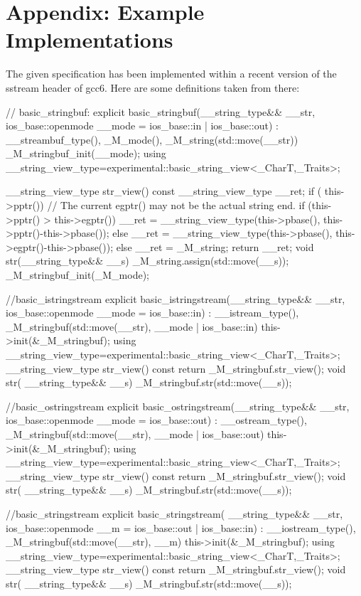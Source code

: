\documentclass[ebook,11pt,article]{memoir}
\begin{document}
\chapter{Appendix: Example Implementations}

The given specification has been implemented within a recent version of the sstream header of gcc6. Here are some definitions taken from there:
\begin{codeblock}
// basic_stringbuf:
      explicit
      basic_stringbuf(__string_type&& __str,
		      ios_base::openmode __mode = ios_base::in | ios_base::out)
      : __streambuf_type(), _M_mode(), _M_string(std::move(__str))
      { _M_stringbuf_init(__mode); }
  	using __string_view_type=experimental::basic_string_view<_CharT,_Traits>;

      __string_view_type str_view() const {
      	__string_view_type __ret{};
      	if ( this->pptr())  {
      	    // The current egptr() may not be the actual string end.
      	    if (this->pptr() > this->egptr())
      	      __ret = __string_view_type(this->pbase(), this->pptr()-this->pbase());
      	    else
       	      __ret = __string_view_type(this->pbase(), this->egptr()-this->pbase());
      	  }
      	else {
      		__ret = _M_string;
      	}
      	return __ret;
      }
     void
      str(__string_type&& __s)
      {
	_M_string.assign(std::move(__s));
	_M_stringbuf_init(_M_mode);
      }

//basic_istringstream
      explicit
      basic_istringstream(__string_type&& __str,
			  ios_base::openmode __mode = ios_base::in)
      : __istream_type(), _M_stringbuf(std::move(__str), __mode | ios_base::in)
      { this->init(&_M_stringbuf); }
  	using __string_view_type=experimental::basic_string_view<_CharT,_Traits>;
      __string_view_type
      str_view() const
      { return _M_stringbuf.str_view(); }
      void
      str( __string_type&& __s)
      { _M_stringbuf.str(std::move(__s)); }

//basic_ostringstream
      explicit
      basic_ostringstream(__string_type&& __str,
			  ios_base::openmode __mode = ios_base::out)
      : __ostream_type(), _M_stringbuf(std::move(__str), __mode | ios_base::out)
      { this->init(&_M_stringbuf); }
  	using __string_view_type=experimental::basic_string_view<_CharT,_Traits>;
      __string_view_type
      str_view() const
      { return _M_stringbuf.str_view(); }
      void
      str( __string_type&& __s)
      { _M_stringbuf.str(std::move(__s)); }

//basic_stringstream
      explicit
      basic_stringstream( __string_type&& __str,
			 ios_base::openmode __m = ios_base::out | ios_base::in)
      : __iostream_type(), _M_stringbuf(std::move(__str), __m)
      { this->init(&_M_stringbuf); }
  	using __string_view_type=experimental::basic_string_view<_CharT,_Traits>;
      __string_view_type
      str_view() const
      { return _M_stringbuf.str_view(); }
      void
      str( __string_type&& __s)
      { _M_stringbuf.str(std::move(__s)); }

\end{codeblock}
\end{document}
